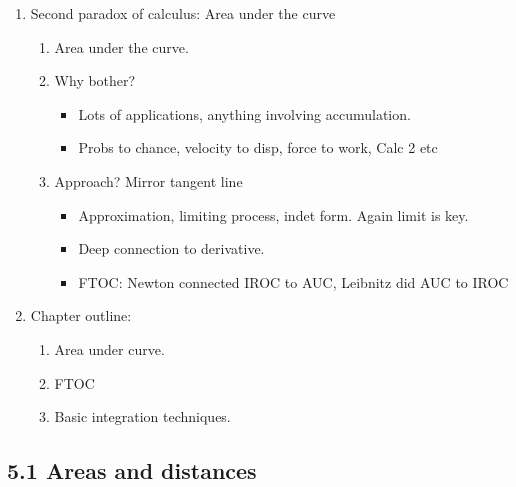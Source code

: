 \documentclass{article}
\begin{document}
\begin{enumerate}
\item Second paradox of calculus: Area under the curve
\begin{enumerate}
\item Area under the curve.
\item Why bother?
\begin{itemize}
\item Lots of applications, anything involving accumulation.
\item Probs to chance, velocity to disp, force to work, Calc 2 etc
\end{itemize}
\item Approach? Mirror tangent line
\begin{itemize}
\item Approximation, limiting process, indet form. Again limit is key.
\item Deep connection to derivative.
\item FTOC: Newton connected IROC to AUC, Leibnitz did AUC to IROC
\end{itemize}
\end{enumerate}

\item Chapter outline:
\begin{enumerate}
\item Area under curve.
\item FTOC
\item Basic integration techniques.
\end{enumerate}
\end{enumerate}

\subsection{5.1 Areas and distances}
\end{document}
